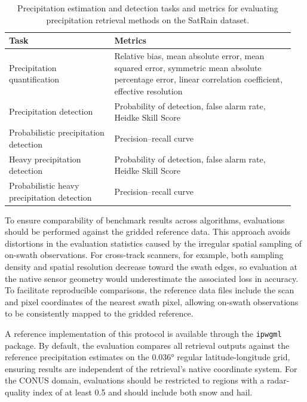 \documentclass[11pt]{article}
\begin{document}
\begin{table}[htbp]
\centering
\caption{Precipitation estimation and detection tasks and metrics for evaluating
  precipitation retrieval methods on the SatRain dataset.}
\begin{tabular}{>{\raggedright\arraybackslash}p{0.35\linewidth}
                >{\raggedright\arraybackslash}p{0.6\linewidth}} \toprule
  \textbf{Task} & \textbf{Metrics} \\ \midrule Precipitation quantification &
  Relative bias, mean absolute error, mean squared error, symmetric mean
  absolute percentage error, linear correlation coefficient, effective
  resolution \\
\addlinespace
Precipitation detection & Probability of detection, false alarm rate, Heidke
Skill Score \\
\addlinespace
Probabilistic precipitation detection & Precision--recall curve \\
\addlinespace
Heavy precipitation detection & Probability of detection, false alarm rate,
Heidke Skill Score \\
\addlinespace
Probabilistic heavy precipitation detection & Precision--recall curve
\\ \bottomrule
\end{tabular}
\end{table}

To ensure comparability of benchmark results across algorithms, evaluations
should be performed against the gridded reference data. This approach avoids
distortions in the evaluation statistics caused by the irregular spatial
sampling of on-swath observations. For cross-track scanners, for example, both
sampling density and spatial resolution decrease toward the swath edges, so
evaluation at the native sensor geometry would underestimate the associated loss
in accuracy. To facilitate reproducible comparisons, the reference data files
include the scan and pixel coordinates of the nearest swath pixel, allowing
on-swath observations to be consistently mapped to the gridded reference.

A reference implementation of this protocol is available through the
\texttt{ipwgml} package. By default, the evaluation compares all retrieval
outputs against the reference precipitation estimates on the 0.036° regular
latitude-longitude grid, ensuring results are independent of the retrieval’s
native coordinate system. For the CONUS domain, evaluations should be restricted
to regions with a radar-quality index of at least 0.5 and should include both
snow and hail.
\end{document}
